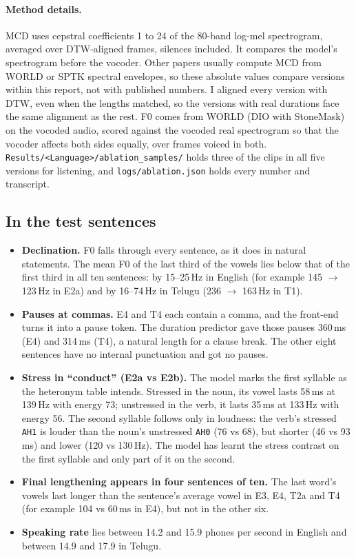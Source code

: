 \documentclass[11pt,a4paper]{article}
\newcommand{\code}[1]{\texttt{#1}}
\begin{document}
\paragraph{Method details.} MCD uses cepstral coefficients 1 to 24 of the 80-band log-mel spectrogram, averaged
over DTW-aligned frames, silences included. It compares the model's spectrogram before the vocoder. Other papers
usually compute MCD from WORLD or SPTK spectral envelopes, so these absolute values compare versions within this
report, not with published numbers. I aligned every version with DTW, even when the lengths matched, so the
versions with real durations face the same alignment as the rest. F0 comes from WORLD (DIO with StoneMask) on the
vocoded audio, scored against the vocoded real spectrogram so that the vocoder affects both sides equally, over
frames voiced in both. \code{Results/<Language>/ablation\_samples/} holds three of the clips in all five versions
for listening, and \code{logs/ablation.json} holds every number and transcript.

\subsection{In the test sentences}
\begin{itemize}
\item \textbf{Declination.} F0 falls through every sentence, as it does in natural statements. The mean F0 of the
last third of the vowels lies below that of the first third in all ten sentences: by 15--25\,Hz in English
(for example 145 $\to$ 123\,Hz in E2a) and by 16--74\,Hz in Telugu (236 $\to$ 163\,Hz in T1).
\item \textbf{Pauses at commas.} E4 and T4 each contain a comma, and the front-end turns it into a pause token.
The duration predictor gave those pauses 360\,ms (E4) and 314\,ms (T4), a natural length for a clause break. The
other eight sentences have no internal punctuation and got no pauses.
\item \textbf{Stress in ``conduct'' (E2a vs E2b).} The model marks the first syllable as the heteronym table
intends. Stressed in the noun, its vowel lasts 58\,ms at 139\,Hz with energy 73; unstressed in the verb, it lasts
35\,ms at 133\,Hz with energy 56. The second syllable follows only in loudness: the verb's stressed \code{AH1} is
louder than the noun's unstressed \code{AH0} (76 vs 68), but shorter (46 vs 93\,ms) and lower (120 vs 130\,Hz).
The model has learnt the stress contrast on the first syllable and only part of it on the second.
\item \textbf{Final lengthening appears in four sentences of ten.} The last word's vowels last longer than the
sentence's average vowel in E3, E4, T2a and T4 (for example 104 vs 60\,ms in E4), but not in the other six.
\item \textbf{Speaking rate} lies between 14.2 and 15.9 phones per second in English and between 14.9 and 17.9 in
Telugu.
\end{itemize}
\end{document}
